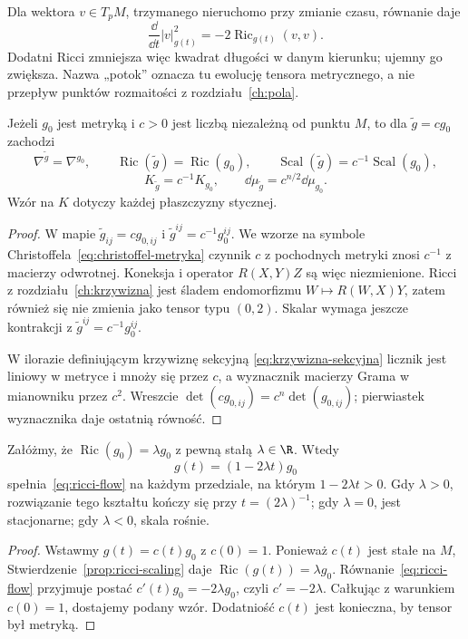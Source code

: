 Dla wektora $v\in T_pM$, trzymanego nieruchomo przy zmianie
czasu, równanie daje
\[
 \frac{\dd}{\dd t}|v|_{g(t)}^2
 =-2\operatorname{Ric}_{g(t)}(v,v).
\]
Dodatni Ricci zmniejsza więc kwadrat długości w danym
kierunku; ujemny go zwiększa. Nazwa „potok” oznacza tu
ewolucję tensora metrycznego, a nie przepływ punktów
rozmaitości z rozdziału~\ref{ch:pola}.

\begin{stwierdzenie}
\label{prop:ricci-scaling}
Jeżeli $g_0$ jest metryką i $c>0$ jest liczbą niezależną
od punktu $M$, to dla $\widetilde g=cg_0$ zachodzi
\[
 \nabla^{\widetilde g}=\nabla^{g_0},\qquad
 \operatorname{Ric}(\widetilde g)=\operatorname{Ric}(g_0),
 \qquad \operatorname{Scal}(\widetilde g)
          =c^{-1}\operatorname{Scal}(g_0),
\]
\[
 K_{\widetilde g}=c^{-1}K_{g_0},\qquad
 \dd\mu_{\widetilde g}=c^{n/2}\dd\mu_{g_0}.
\]
Wzór na $K$ dotyczy każdej płaszczyzny stycznej.
\end{stwierdzenie}
\begin{proof}
W mapie $\widetilde g_{ij}=cg_{0,ij}$ i
$\widetilde g^{ij}=c^{-1}g_0^{ij}$. We wzorze na symbole
Christoffela~\eqref{eq:christoffel-metryka} czynnik $c$
z pochodnych metryki znosi $c^{-1}$ z macierzy
odwrotnej. Koneksja i operator $R(X,Y)Z$ są więc
niezmienione. Ricci z rozdziału~\ref{ch:krzywizna}
jest śladem endomorfizmu $W\mapsto R(W,X)Y$, zatem
również się nie zmienia jako tensor typu $(0,2)$.
Skalar wymaga jeszcze kontrakcji z
$\widetilde g^{ij}=c^{-1}g_0^{ij}$.

W ilorazie definiującym krzywiznę sekcyjną
\eqref{eq:krzywizna-sekcyjna} licznik jest liniowy
w metryce i mnoży się przez $c$, a wyznacznik
macierzy Grama w mianowniku przez $c^2$. Wreszcie
$\det(cg_{0,ij})=c^n\det(g_{0,ij})$; pierwiastek
wyznacznika daje ostatnią równość.
\end{proof}

\begin{stwierdzenie}
\label{prop:ricci-einstein-flow}
Załóżmy, że $\operatorname{Ric}(g_0)=\lambda g_0$
z pewną stałą $\lambda\in\R$. Wtedy
\begin{equation}\label{eq:ricci-einstein-solution}
 g(t)=(1-2\lambda t)g_0
\end{equation}
spełnia~\eqref{eq:ricci-flow} na każdym przedziale,
na którym $1-2\lambda t>0$. Gdy $\lambda>0$,
rozwiązanie tego kształtu kończy się przy
$t=(2\lambda)^{-1}$; gdy $\lambda=0$, jest stacjonarne;
gdy $\lambda<0$, skala rośnie.
\end{stwierdzenie}
\begin{proof}
Wstawmy $g(t)=c(t)g_0$ z $c(0)=1$. Ponieważ
$c(t)$ jest stałe na $M$, Stwierdzenie~\ref{prop:ricci-scaling}
daje $\operatorname{Ric}(g(t))=\lambda g_0$.
Równanie~\eqref{eq:ricci-flow} przyjmuje postać
$c'(t)g_0=-2\lambda g_0$, czyli $c'=-2\lambda$.
Całkując z warunkiem $c(0)=1$, dostajemy podany wzór.
Dodatniość $c(t)$ jest konieczna, by tensor był metryką.
\end{proof}

